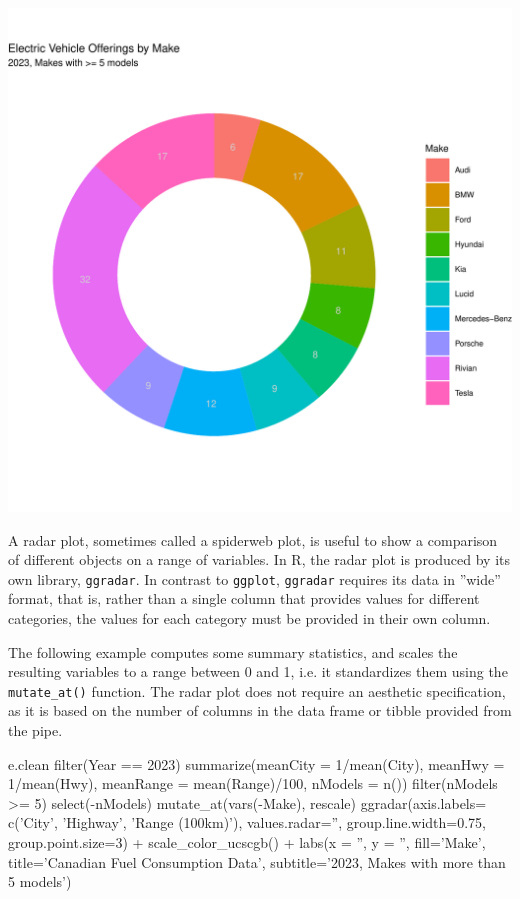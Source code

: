 \begin{center}
  \includegraphics[width=.5\textwidth]{fuel.donut.pdf}
\end{center}

A radar plot, sometimes called a spiderweb plot, is useful to show a comparison of different objects on a range of variables. In R, the radar plot is produced by its own library, \texttt{ggradar}. In contrast to \texttt{ggplot}, \texttt{ggradar} requires its data in ''wide'' format, that is, rather than a single column that provides values for different categories, the values for each category must be provided in their own column. 

The following example computes some summary statistics, and scales the resulting variables to a range between 0 and 1, i.e. it standardizes them using the \texttt{mutate\_at()} function. The radar plot does not require an aesthetic specification, as it is based on the number of columns in the data frame or tibble provided from the pipe.

\begin{samepage}
\begin{Rcode}
e.clean %
  filter(Year == 2023) %
  summarize(meanCity = 1/mean(City), 
            meanHwy = 1/mean(Hwy), 
            meanRange = mean(Range)/100, 
            nModels = n()) %
  filter(nModels >= 5) %
  select(-nModels) %
  mutate_at(vars(-Make), rescale) %
  ggradar(axis.labels=
             c('City', 'Highway', 'Range (100km)'), 
          values.radar='', 
          group.line.width=0.75, 
          group.point.size=3) +
  scale_color_ucscgb() +
  labs(x = '', y = '',  fill='Make', 
       title='Canadian Fuel Consumption Data', 
       subtitle='2023, Makes with more than 5 models')
\end{Rcode}
\end{samepage}

